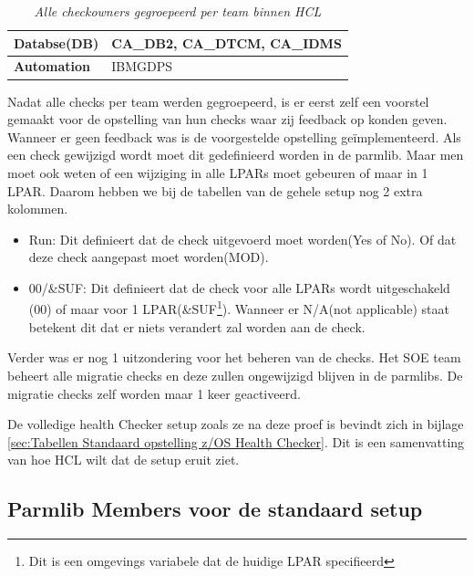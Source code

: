 \begin{table}[h]
\begin{tabular}{|l|p{9cm}|}
		\textbf{Databse(DB)}               & CA\_DB2, CA\_DTCM, CA\_IDMS                                                                                                                                            \\ \hline
		\textbf{Automation}                & IBMGDPS                                                                                                                                                                \\ \hline
	\end{tabular}
	\caption[Checks Per team]{{\small \textit{Alle checkowners gegroepeerd per team binnen HCL}}}
	\label{tbl:Checks Per Team}
\end{table}

Nadat alle checks per team werden gegroepeerd, is er eerst zelf een voorstel gemaakt voor de opstelling van hun checks waar zij feedback op konden geven. Wanneer er geen feedback was is de voorgestelde opstelling geïmplementeerd. Als een check gewijzigd wordt moet dit gedefinieerd worden in de parmlib. Maar men moet ook weten of een wijziging in alle LPARs moet gebeuren of maar in 1 LPAR. Daarom hebben we bij de tabellen van de gehele setup nog 2 extra kolommen.

\begin{itemize}
	\item Run: Dit definieert dat de check uitgevoerd moet worden(Yes of No). Of dat deze check aangepast moet worden(MOD).
	\item 00/\&SUF: Dit definieert dat de check voor alle LPARs wordt uitgeschakeld (00) of maar voor 1 LPAR(\&SUF\footnote{Dit is een omgevings variabele dat de huidige LPAR specifieerd}). Wanneer er N/A(not applicable) staat betekent dit dat er niets verandert zal worden aan de check.
\end{itemize}

Verder was er nog 1 uitzondering voor het beheren van de checks. Het SOE team beheert alle migratie checks en deze zullen ongewijzigd blijven in de parmlibs. De migratie checks zelf worden maar 1 keer geactiveerd.

De volledige health Checker setup zoals ze na deze proef is bevindt zich in bijlage \ref{sec:Tabellen Standaard opstelling z/OS Health Checker}. Dit is een samenvatting van hoe HCL wilt dat de setup eruit ziet. 

\subsection{Parmlib Members voor de standaard setup}
\label{subsec:Parmlib Members voor de standaard setup}

